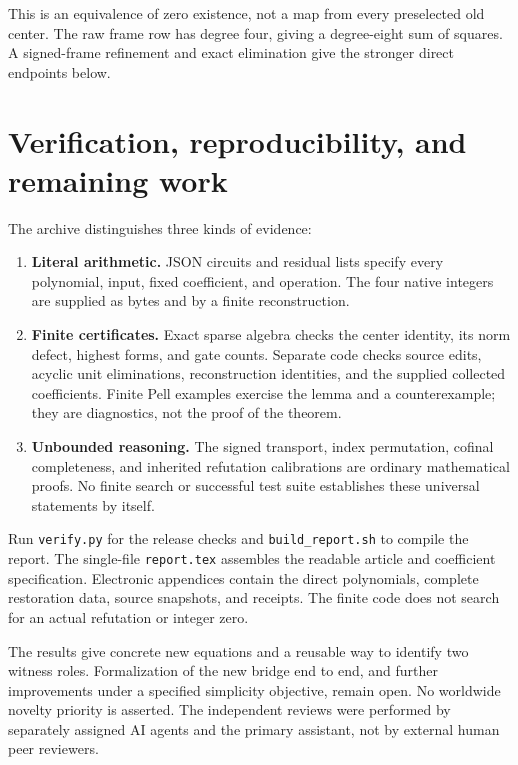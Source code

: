 \documentclass[11pt]{article}
\theoremstyle{remark}
\begin{document}
This is an equivalence of zero existence, not a map from every preselected
old center. The raw frame row has degree four, giving a degree-eight
sum of squares. A signed-frame refinement and exact elimination give
the stronger direct endpoints below.



\section{Verification, reproducibility, and remaining work}
The archive distinguishes three kinds of evidence:
\begin{enumerate}
\item \textbf{Literal arithmetic.} JSON circuits and residual lists specify
every polynomial, input, fixed coefficient, and operation.
The four native integers are supplied as bytes and by a finite reconstruction.
\item \textbf{Finite certificates.} Exact sparse algebra checks the center
identity, its norm defect, highest forms, and gate counts.
Separate code checks source edits, acyclic unit eliminations, reconstruction
identities, and the supplied collected coefficients.
Finite Pell examples exercise the lemma and a counterexample; they are
diagnostics, not the proof of the theorem.
\item \textbf{Unbounded reasoning.} The signed transport, index permutation,
cofinal completeness, and inherited refutation calibrations are ordinary
mathematical proofs. No finite search or successful test suite establishes
these universal statements by itself.
\end{enumerate}

Run \texttt{verify.py} for the release checks and
\texttt{build\_report.sh} to compile the report.
The single-file \texttt{report.tex} assembles the readable article and
coefficient specification. Electronic appendices contain the direct
polynomials, complete restoration data, source snapshots, and receipts.
The finite code does not search for an actual refutation or integer zero.

The results give concrete new equations and a reusable way to identify
two witness roles. Formalization of the new bridge end to end, and
further improvements under a specified simplicity objective, remain open.
No worldwide novelty priority is asserted.
The independent reviews were performed by separately assigned AI agents
and the primary assistant, not by external human peer reviewers.
\end{document}
